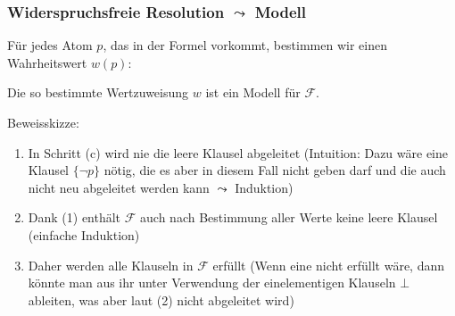 \documentclass[aspectratio=1610,onlymath]{beamer}
\begin{document}
\begin{frame}\frametitle{Widerspruchsfreie Resolution $\leadsto$ Modell}


Für jedes Atom $p$, das in der Formel vorkommt, bestimmen wir einen Wahrheitswert $w(p)$:\medskip

\smallskip

Die so bestimmte Wertzuweisung $w$ ist ein Modell für $\mathcal{F}$.\bigskip

{\tiny  Beweisskizze:
\begin{enumerate}[(1)]
\item In Schritt (c) wird nie die leere Klausel abgeleitet (Intuition: Dazu wäre eine Klausel $\{\neg p\}$ nötig, die es aber in diesem Fall nicht geben darf und die auch nicht neu abgeleitet werden kann $\leadsto$ Induktion)
\item Dank (1) enthält $\mathcal{F}$ auch nach Bestimmung aller Werte keine leere Klausel (einfache Induktion)
\item Daher werden alle Klauseln in $\mathcal{F}$ erfüllt (Wenn eine nicht erfüllt wäre, dann könnte man aus ihr unter Verwendung der einelementigen Klauseln $\bot$ ableiten, was aber laut (2) nicht abgeleitet wird)
\end{enumerate}}
% 

% 

\end{frame}
\end{document}
